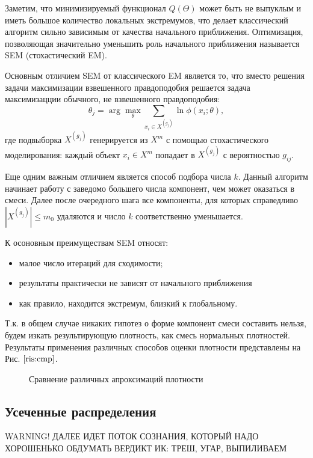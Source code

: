 \documentclass[12pt,a4paper]{report}
\begin{document}
Заметим, что минимизируемый функционал $Q(\Theta)$ может быть не выпуклым и иметь большое количество локальных экстремумов, что делает классический алгоритм сильно зависимым от качества начального приближения. Оптимизация, позволяющая значительно уменьшить роль начального приближения называется SEM (стохастический EM).

Основным отличием SEM от классического EM является то, что вместо решения задачи максимизации взвешенного правдоподобия решается задача максимизацции обычного, не взвешенного правдоподобия:
\begin{equation*}
\theta_j = \arg \max_{\theta} \sum_{x_i \in X^{(g_j)}} \ln \phi(x_i; \theta),
\end{equation*}
где подвыборка $X^{(g_j)}$ генерируется из $X^m$ с помощью стохастического моделирования: каждый объект $x_i \in X^m$ попадает в $X^{(g_j)}$ с вероятностью $g_{ij}$.

Еще одним важным отличием является способ подбора числа $k$. Данный алгоритм начинает работу с заведомо большего числа компонент, чем может оказаться в смеси. Далее после очередного шага все компоненты, для которых справедливо $|X^{(g_j)}| \le m_0$ удаляются и число $k$ соответственно уменьшается.

К осоновным преимуществам SEM относят:
\begin{itemize}
\item малое число итераций для сходимости;
\item результаты практически не зависят от начального приближения
\item как правило, находится экстремум, близкий к глобальному.
\end{itemize}

Т.к. в общем случае никаких гипотез о форме компонент смеси составить нельзя, будем изкать результирующую плотность, как смесь нормальных плотностей. Результаты применения различных способов оценки плотности представлены на Рис.  $\ref{ris:cmp}$.

\begin{figure}[H]
\caption{Сравнение различных апроксимаций плотности}
\label{ris:cmp}
\end{figure}

\subsection{Усеченные распределения}
WARNING! ДАЛЕЕ ИДЕТ ПОТОК СОЗНАНИЯ, КОТОРЫЙ НАДО ХОРОШЕНЬКО ОБДУМАТЬ
ВЕРДИКТ ИК: ТРЕШ, УГАР, ВЫПИЛИВАЕМ
\end{document}
